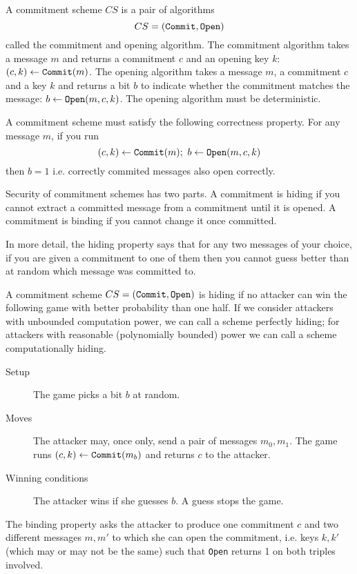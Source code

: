 \documentclass{llncs}
\newcommand{\alg}[1]{\textup{\texttt{#1}}}
\begin{document}
\begin{definition}
A commitment scheme $CS$ is a pair of algorithms
\[
CS = \left( \alg{Commit}, \alg{Open}\right)
\]
called the commitment and opening algorithm. The commitment algorithm takes a
message $m$ and returns a commitment $c$ and an opening key $k$: $(c, k) \gets
\alg{Commit}(m)$. The opening algorithm takes a message $m$, a commitment $c$
and a key $k$ and returns a bit $b$ to indicate whether the commitment matches
the message: $b \gets \alg{Open}(m, c, k)$. The opening algorithm must be
deterministic.

A commitment scheme must satisfy the following correctness property. For any
message $m$, if you run
\[
(c, k) \gets \alg{Commit}(m);\ b \gets \alg{Open}(m, c, k)
\]
then $b = 1$ i.e. correctly commited messages also open correctly.
\end{definition}

Security of commitment schemes has two parts. A commitment is hiding if you
cannot extract a committed message from a commitment until it is opened. A
commitment is binding if you cannot change it once committed.

In more detail, the hiding property says that for any two messages of your
choice, if you are given a commitment to one of them then you cannot guess
better than at random which message was committed to.

\begin{definition}
A commitment scheme $CS = (\alg{Commit}, \alg{Open})$ is hiding if no attacker
can win the following game with better probability than one half. If we consider
attackers with unbounded computation power, we can call a scheme perfectly
hiding; for attackers with reasonable (polynomially bounded) power we can call a
scheme computationally hiding.

\begin{description}
\item[Setup]
The game picks a bit $b$ at random.

\item[Moves]
The attacker may, once only, send a pair of messages $m_0, m_1$. The game runs
$(c, k) \gets \alg{Commit}(m_b)$ and returns $c$ to the attacker.

\item[Winning conditions]
The attacker wins if she guesses $b$. A guess stops the game.
\end{description}
\end{definition}

The binding property asks the attacker to produce one commitment $c$ and two
different messages $m, m'$ to which she can open the commitment, i.e. keys
$k, k'$ (which may or may not be the same) such that \alg{Open} returns 1 on
both triples involved.
\end{document}
